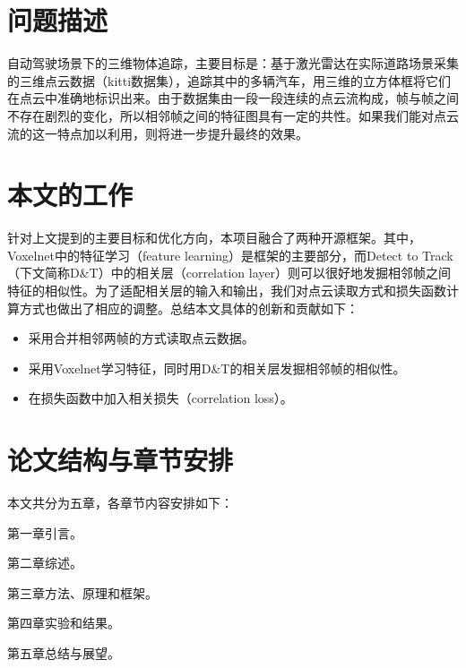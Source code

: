 \section{问题描述}
\label{sec:problem_description}
自动驾驶场景下的三维物体追踪，主要目标是：基于激光雷达在实际道路场景采集的三维点云数据（kitti数据集），追踪其中的多辆汽车，用三维的立方体框将它们在点云中准确地标识出来。由于数据集由一段一段连续的点云流构成，帧与帧之间不存在剧烈的变化，所以相邻帧之间的特征图具有一定的共性。如果我们能对点云流的这一特点加以利用，则将进一步提升最终的效果。

\section{本文的工作}
\label{sec:key_work}
针对上文提到的主要目标和优化方向，本项目融合了两种开源框架。其中，Voxelnet中的特征学习（feature learning）是框架的主要部分，而Detect to Track（下文简称D&T）中的相关层（correlation layer）则可以很好地发掘相邻帧之间特征的相似性。为了适配相关层的输入和输出，我们对点云读取方式和损失函数计算方式也做出了相应的调整。总结本文具体的创新和贡献如下：
\begin{itemize}
	\item 采用合并相邻两帧的方式读取点云数据。
	\item 采用Voxelnet学习特征，同时用D&T的相关层发掘相邻帧的相似性。
	\item 在损失函数中加入相关损失（correlation loss）。
\end{itemize}

\section{论文结构与章节安排}
\label{sec:arrangement}
本文共分为五章，各章节内容安排如下：

第一章引言。

第二章综述。

第三章方法、原理和框架。

第四章实验和结果。

第五章总结与展望。

